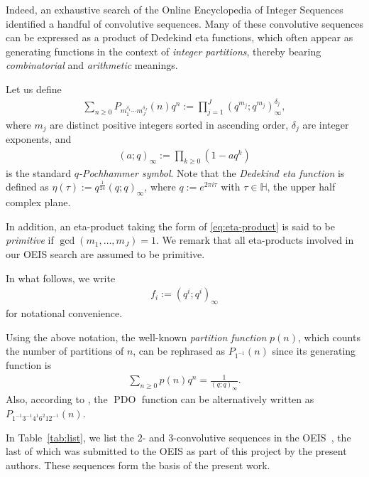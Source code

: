 \documentclass[12pt,reqno]{amsart}
\numberwithin{equation}{section}
\theoremstyle{plain}
\theoremstyle{definition}
\theoremstyle{named}
\newcommand{\PDO}{\operatorname{PDO}}
\begin{document}
Indeed, an exhaustive search of the Online Encyclopedia of Integer Sequences~\cite{OEIS} identified a handful of convolutive sequences. Many of these convolutive sequences can be expressed as a product of Dedekind eta functions, which often appear as generating functions in the context of \emph{integer partitions}, thereby bearing  \emph{combinatorial} and \emph{arithmetic} meanings.

Let us define
\begin{align}\label{eq:eta-product}
	\sum_{n\ge 0} P_{m_1^{\delta_1}\cdots m_{J}^{\delta_J}}(n) q^n := \prod_{j=1}^J (q^{m_j};q^{m_j})_{\infty}^{\delta_j},
\end{align}
where $m_j$ are distinct positive integers sorted in ascending order, $\delta_j$ are integer exponents, and
\begin{align*}
	(a;q)_\infty := \prod_{k\ge 0} (1-aq^k)
\end{align*}
is the standard \emph{$q$-Pochhammer symbol}. Note that the \emph{Dedekind eta function} is defined as $\eta(\tau) := q^{\frac{1}{24}}(q;q)_\infty$, where $q:=e^{2\pi i\tau}$ with $\tau\in \mathbb{H}$, the upper half complex plane.

In addition, an eta-product taking the form of \eqref{eq:eta-product} is said to be \emph{primitive} if $\gcd(m_1, \ldots, m_J) = 1$. We remark that all eta-products involved in our OEIS search are assumed to be primitive.

In what follows, we write
\begin{align*}
	f_i := (q^i;q^i)_\infty
\end{align*}  
for notational convenience.  

Using the above notation, the well-known \emph{partition function} $p(n)$, which counts the number of partitions of $n$, can be rephrased as $P_{1^{-1}}(n)$ since its generating function is
\begin{align*}
	\sum_{n\ge 0} p(n) q^n = \frac{1}{(q;q)_\infty}.
\end{align*}
Also, according to \cite[p.~52, eq.~(1.6)]{ALL2002}, the $\PDO$ function can be alternatively written as $P_{1^{-1}3^{-1}4^{1}6^{2}12^{-1}}(n)$.

In Table~\ref{tab:list}, we list the $2$- and $3$-convolutive sequences in the OEIS~\cite{OEIS}, the last of which was submitted to the OEIS as part of this project by the present authors. These sequences form the basis of the present work.
\end{document}
